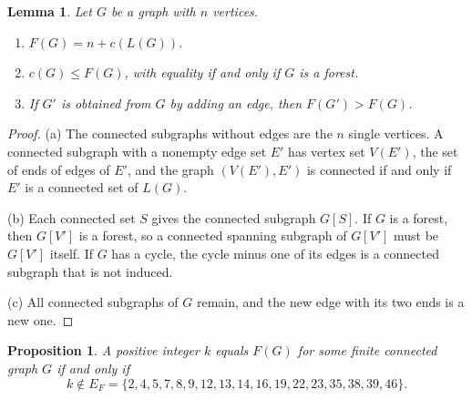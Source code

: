\documentclass[11pt]{amsart}
\newtheorem{lemma}[theorem]{Lemma}
\newtheorem{proposition}[theorem]{Proposition}
\theoremstyle{definition}
\theoremstyle{remark}
\begin{document}
\begin{lemma}\label{lem:F}
Let $G$ be a graph with $n$ vertices.
\begin{enumerate}[label=\textup{(\alph*)}]
\item $F(G)=n+c(L(G))$.
\item $c(G)\le F(G)$, with equality if and only if $G$ is a forest.
\item If $G'$ is obtained from $G$ by adding an edge, then $F(G')>F(G)$.
\end{enumerate}
\end{lemma}

\begin{proof}
(a) The connected subgraphs without edges are the $n$ single vertices. A connected subgraph with a nonempty edge set $E'$ has vertex set $V(E')$, the set of ends of edges of $E'$, and the graph $(V(E'),E')$ is connected if and only if $E'$ is a connected set of $L(G)$.

(b) Each connected set $S$ gives the connected subgraph $G[S]$. If $G$ is a forest, then $G[V']$ is a forest, so a connected spanning subgraph of $G[V']$ must be $G[V']$ itself. If $G$ has a cycle, the cycle minus one of its edges is a connected subgraph that is not induced.

(c) All connected subgraphs of $G$ remain, and the new edge with its two ends is a new one.
\end{proof}

\begin{proposition}\label{prop:F}
A positive integer $k$ equals $F(G)$ for some finite connected graph $G$ if and only if
\[
k\notin E_F=\{2,4,5,7,8,9,12,13,14,16,19,22,23,35,38,39,46\}.
\]
\end{proposition}
\end{document}
